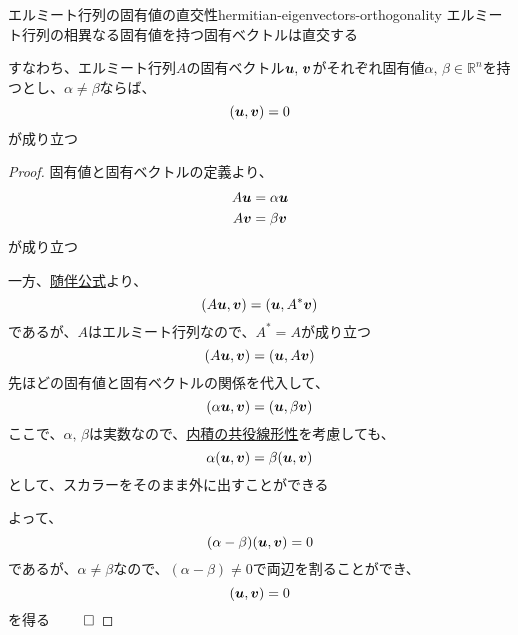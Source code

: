 \documentclass[../../../topic_linear-algebra]{subfiles}
\begin{document}
\begin{theorem}{エルミート行列の固有値の直交性}{hermitian-eigenvectors-orthogonality}
  エルミート行列の相異なる固有値を持つ固有ベクトルは直交する

  すなわち、エルミート行列$A$の固有ベクトル$\vb*{u},\,\vb*{v}$がそれぞれ固有値$\alpha,\,\beta \in \mathbb{R}^n$を持つとし、$\alpha \neq \beta$ならば、
  \begin{equation*}
    (\vb*{u}, \vb*{v}) = 0
  \end{equation*}
  が成り立つ
\end{theorem}

\begin{proof}
  固有値と固有ベクトルの定義より、
  \begin{align*}
    A\vb*{u} & = \alpha \vb*{u} \\
    A\vb*{v} & = \beta \vb*{v}
  \end{align*}
  が成り立つ

  \br

  一方、\hyperref[thm:adjoint-identity]{随伴公式}より、
  \begin{equation*}
    (A\vb*{u}, \vb*{v}) = (\vb*{u}, A^*\vb*{v})
  \end{equation*}
  であるが、$A$はエルミート行列なので、$A^* = A$が成り立つ
  \begin{equation*}
    (A\vb*{u}, \vb*{v}) = (\vb*{u}, A\vb*{v})
  \end{equation*}
  先ほどの固有値と固有ベクトルの関係を代入して、
  \begin{equation*}
    (\alpha \vb*{u}, \vb*{v}) = (\vb*{u}, \beta \vb*{v})
  \end{equation*}
  ここで、$\alpha,\,\beta$は実数なので、\hyperref[thm:conjugate-linearity-of-inner-product]{内積の共役線形性}を考慮しても、
  \begin{equation*}
    \alpha (\vb*{u}, \vb*{v}) = \beta (\vb*{u}, \vb*{v})
  \end{equation*}
  として、スカラーをそのまま外に出すことができる

  \br

  よって、
  \begin{equation*}
    (\alpha - \beta)(\vb*{u}, \vb*{v}) = 0
  \end{equation*}
  であるが、$\alpha \neq \beta$なので、$(\alpha - \beta) \neq 0$で両辺を割ることができ、
  \begin{equation*}
    (\vb*{u}, \vb*{v}) = 0
  \end{equation*}
  を得る $\qed$
\end{proof}
\end{document}
